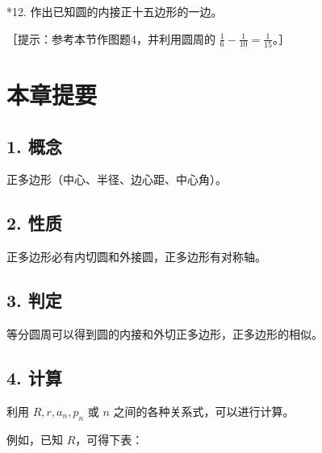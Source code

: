 *12. 作出已知圆的内接正十五边形的一边。

［提示：参考本节作图题4，并利用圆周的
\(\frac{1}{6} -\frac{1}{10} = \frac{1}{15}\)。］

\section{本章提要}

\subsection{1. 概念}

正多边形（中心、半径、边心距、中心角）。

\subsection{2. 性质}

正多边形必有内切圆和外接圆，正多边形有对称轴。

\subsection{3. 判定}

等分圆周可以得到圆的内接和外切正多边形，正多边形的相似。

\subsection{4. 计算}

利用 \(R,r,a_n,p_n\) 或 \(n\) 之间的各种关系式，可以进行计算。

例如，已知 \(R\)，可得下表：

